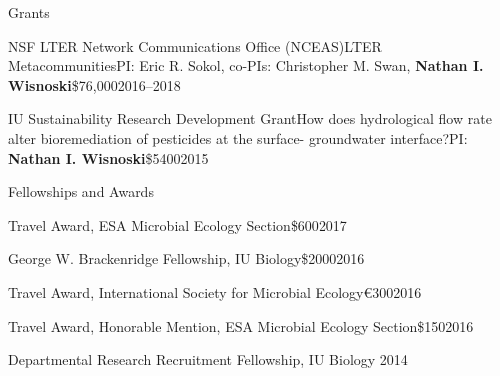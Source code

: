 \documentclass{resume} %
\begin{document}
\begin{rSection}{Grants}

\begin{Grant}{NSF LTER Network Communications Office (NCEAS)}{LTER Metacommunities}{PI: Eric R. Sokol, co-PIs: Christopher M. Swan, {\bf Nathan I. Wisnoski}}{\$76,000}{2016--2018}
\end{Grant}

\begin{Grant}{IU Sustainability Research Development Grant}{How does hydrological flow rate alter bioremediation of pesticides at the surface- groundwater interface?}{PI: {\bf Nathan I. Wisnoski}}{\$5400}{2015}
\end{Grant}

\end{rSection}



\begin{rSection}{Fellowships and Awards}

\begin{Award}{Travel Award, ESA Microbial Ecology Section}{\$600}{2017}
\end{Award}

\begin{Award}{George W. Brackenridge Fellowship, IU Biology}{\$2000}{2016}
\end{Award}

\begin{Award}{Travel Award, International Society for Microbial Ecology}{\euro{}300}{2016}
\end{Award}

\begin{Award}{Travel Award, Honorable Mention, ESA Microbial Ecology Section}{\$150}{2016}
\end{Award}

\begin{Award}{Departmental Research Recruitment Fellowship, IU Biology}{ }{2014}
\end{Award}

\end{rSection}


\end{document}
